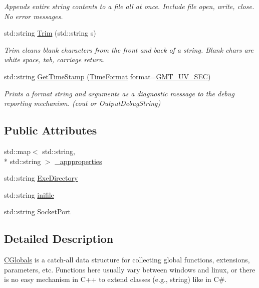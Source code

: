 \begin{DoxyCompactItemize}
\begin{DoxyCompactList}\small\item\em Appends entire string contents to a file all at once. Include file open, write, close. No error messages. \end{DoxyCompactList}\item 
std\-::string \hyperlink{classCGlobals_aba6226926f731d175e54efa0dec2833b}{Trim} (std\-::string s)
\begin{DoxyCompactList}\small\item\em Trim cleans blank characters from the front and back of a string. Blank chars are white space, tab, carriage return. \end{DoxyCompactList}\item 
std\-::string \hyperlink{classCGlobals_abd6bdad8865f80e6a084c6f02a1cd047}{Get\-Time\-Stamp} (\hyperlink{classCGlobals_a32f8f289bca445b5a2f6d1c68b6cbbb2}{Time\-Format} format=\hyperlink{classCGlobals_a32f8f289bca445b5a2f6d1c68b6cbbb2ab0c064ba74b13a541bb4b8379bca2ae7}{G\-M\-T\-\_\-\-U\-V\-\_\-\-S\-E\-C})
\begin{DoxyCompactList}\small\item\em Prints a format string and arguments as a diagnostic message to the debug reporting mechanism. (cout or Output\-Debug\-String) \end{DoxyCompactList}\end{DoxyCompactItemize}
\subsection*{Public Attributes}
\begin{DoxyCompactItemize}
\item 
std\-::map$<$ std\-::string, \\*
std\-::string $>$ \hyperlink{classCGlobals_a66ffe804a7f6a8d41803482f5dc121e6}{\-\_\-appproperties}
\item 
std\-::string \hyperlink{classCGlobals_a366c33d78a09a99d5eb0e902facf4624}{Exe\-Directory}
\item 
std\-::string \hyperlink{classCGlobals_a5ded9605f21a03f651f6097f1b0ef42c}{inifile}
\item 
std\-::string \hyperlink{classCGlobals_ac1198be99fab95dbe1f2b94891fb0088}{Socket\-Port}
\end{DoxyCompactItemize}


\subsection{Detailed Description}
\hyperlink{classCGlobals}{C\-Globals} is a catch-\/all data structure for collecting global functions, extensions, parameters, etc. Functions here usually vary between windows and linux, or there is no easy mechanism in C++ to extend classes (e.\-g., string) like in C\#. 

